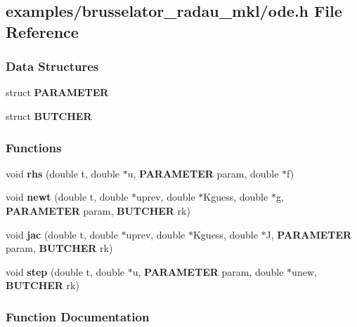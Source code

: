 \subsection{examples/brusselator\+\_\+radau\+\_\+mkl/ode.h File Reference}
\label{ode_8h}
\subsubsection*{Data Structures}
\begin{DoxyCompactItemize}
\item 
struct {\bf P\+A\+R\+A\+M\+E\+T\+E\+R}
\item 
struct {\bf B\+U\+T\+C\+H\+E\+R}
\end{DoxyCompactItemize}
\subsubsection*{Functions}
\begin{DoxyCompactItemize}
\item 
void {\bf rhs} (double t, double $\ast$u, {\bf P\+A\+R\+A\+M\+E\+T\+E\+R} param, double $\ast$f)
\item 
void {\bf newt} (double t, double $\ast$uprev, double $\ast$Kguess, double $\ast$g, {\bf P\+A\+R\+A\+M\+E\+T\+E\+R} param, {\bf B\+U\+T\+C\+H\+E\+R} rk)
\item 
void {\bf jac} (double t, double $\ast$uprev, double $\ast$Kguess, double $\ast$J, {\bf P\+A\+R\+A\+M\+E\+T\+E\+R} param, {\bf B\+U\+T\+C\+H\+E\+R} rk)
\item 
void {\bf step} (double t, double $\ast$u, {\bf P\+A\+R\+A\+M\+E\+T\+E\+R} param, double $\ast$unew, {\bf B\+U\+T\+C\+H\+E\+R} rk)
\end{DoxyCompactItemize}


\subsubsection{Function Documentation}
